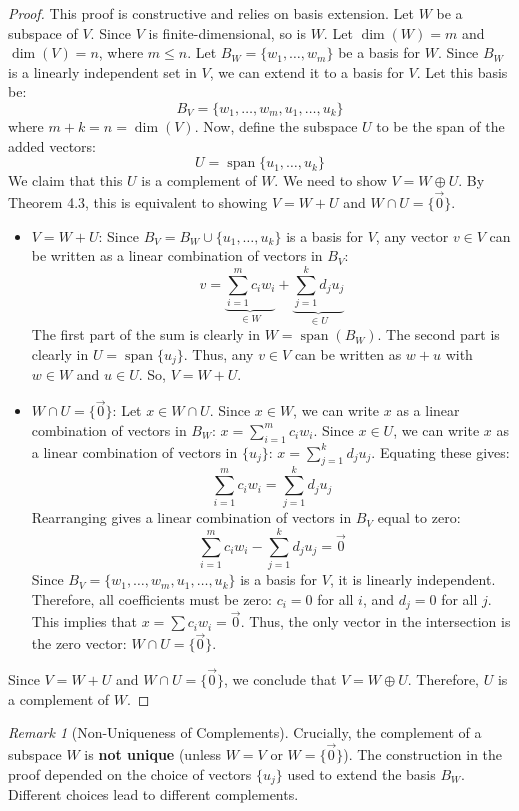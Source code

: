 \documentclass[11pt]{article}
\theoremstyle{definition}
\theoremstyle{remark}
\newtheorem{remark}[theorem]{Remark}
\newcommand{\dimn}{\operatorname{dim}}
\newcommand{\spanv}{\operatorname{span}}
\newcommand{\intersect}{\cap}
\newcommand{\union}{\cup}
\newcommand{\directsum}{\oplus}
\begin{document}
\begin{proof}
This proof is constructive and relies on basis extension.
Let $W$ be a subspace of $V$. Since $V$ is finite-dimensional, so is $W$. Let $\dimn(W)=m$ and $\dimn(V)=n$, where $m \le n$.
Let $B_W = \{w_1, \dots, w_m\}$ be a basis for $W$.
Since $B_W$ is a linearly independent set in $V$, we can extend it to a basis for $V$. Let this basis be:
\[ B_V = \{w_1, \dots, w_m, u_1, \dots, u_k\} \]
where $m+k = n = \dimn(V)$.
Now, define the subspace $U$ to be the span of the added vectors:
\[ U = \spanv\{u_1, \dots, u_k\} \]
We claim that this $U$ is a complement of $W$. We need to show $V = W \directsum U$. By Theorem 4.3, this is equivalent to showing $V = W+U$ and $W \intersect U = \{\vec{0}\}$.

\begin{itemize}
    \item \textbf{$V = W+U$}: Since $B_V = B_W \union \{u_1, \dots, u_k\}$ is a basis for $V$, any vector $v \in V$ can be written as a linear combination of vectors in $B_V$:
    \[ v = \underbrace{\sum_{i=1}^m c_i w_i}_{\in W} + \underbrace{\sum_{j=1}^k d_j u_j}_{\in U} \]
    The first part of the sum is clearly in $W = \spanv(B_W)$. The second part is clearly in $U = \spanv\{u_j\}$. Thus, any $v \in V$ can be written as $w+u$ with $w \in W$ and $u \in U$. So, $V = W+U$.

    \item \textbf{$W \intersect U = \{\vec{0}\}$}: Let $x \in W \intersect U$.
    Since $x \in W$, we can write $x$ as a linear combination of vectors in $B_W$: $x = \sum_{i=1}^m c_i w_i$.
    Since $x \in U$, we can write $x$ as a linear combination of vectors in $\{u_j\}$: $x = \sum_{j=1}^k d_j u_j$.
    Equating these gives:
    \[ \sum_{i=1}^m c_i w_i = \sum_{j=1}^k d_j u_j \]
    Rearranging gives a linear combination of vectors in $B_V$ equal to zero:
    \[ \sum_{i=1}^m c_i w_i - \sum_{j=1}^k d_j u_j = \vec{0} \]
    Since $B_V = \{w_1, \dots, w_m, u_1, \dots, u_k\}$ is a basis for $V$, it is linearly independent. Therefore, all coefficients must be zero: $c_i = 0$ for all $i$, and $d_j = 0$ for all $j$.
    This implies that $x = \sum c_i w_i = \vec{0}$.
    Thus, the only vector in the intersection is the zero vector: $W \intersect U = \{\vec{0}\}$.
\end{itemize}
Since $V=W+U$ and $W \intersect U = \{\vec{0}\}$, we conclude that $V = W \directsum U$. Therefore, $U$ is a complement of $W$.
\end{proof}

\begin{remark}[Non-Uniqueness of Complements]
Crucially, the complement of a subspace $W$ is \textbf{not unique} (unless $W=V$ or $W=\{\vec{0}\}$). The construction in the proof depended on the choice of vectors $\{u_j\}$ used to extend the basis $B_W$. Different choices lead to different complements.
\end{remark}
\end{document}
